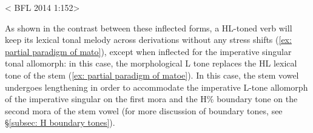     \label{ex: partial paradigm of matoa}
        \label{ex: partial paradigm of matob}
            \label{ex: partial paradigm of matoc}
                \label{ex: partial paradigm of matod}
                    \label{ex: partial paradigm of matoe}
{< BFL 2014 1:152>}
    \z
\z

As shown in the contrast between these inflected forms, a HL-toned verb will keep its lexical tonal melody across derivations without any stress shifts (\ref{ex: partial paradigm of mato}), except when inflected for the imperative singular tonal allomorph: in this case, the morphological L tone replaces the HL lexical tone of the stem (\ref{ex: partial paradigm of matoe}). In this case, the stem vowel undergoes lengthening in order to accommodate the imperative L-tone allomorph of the imperative singular on the first mora and the H\% boundary tone on the second mora of the stem vowel (for more discussion of boundary tones, see §\ref{subsec: H boundary tones}).

